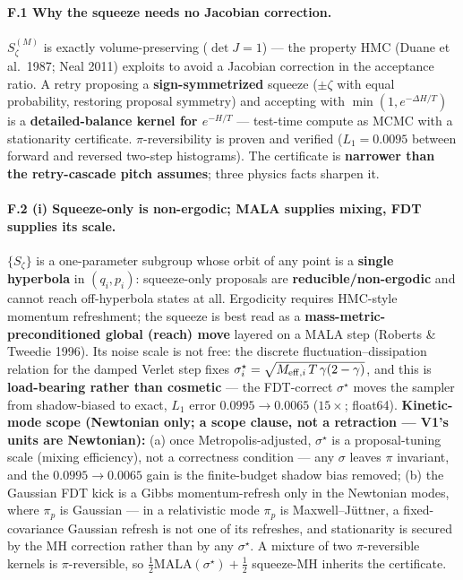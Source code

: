 \documentclass[11pt]{article}
\newcommand{\half}{\tfrac12}
\newcommand{\detJ}{\det J}
\begin{document}
\paragraph{F.1 Why the squeeze needs no Jacobian correction.} $S^{(M)}_\zeta$ is exactly volume-preserving ($\detJ=1$) --- the property HMC (Duane et al.\ 1987; Neal 2011) exploits to avoid a Jacobian correction in the acceptance ratio. A retry proposing a \textbf{sign-symmetrized} squeeze ($\pm\zeta$ with equal probability, restoring proposal symmetry) and accepting with $\min(1,e^{-\Delta H/T})$ is a \textbf{detailed-balance kernel for $e^{-H/T}$} --- test-time compute as MCMC with a stationarity certificate. $\pi$-reversibility is proven and verified ($L_1=0.0095$ between forward and reversed two-step histograms). The certificate is \textbf{narrower than the retry-cascade pitch assumes}; three physics facts sharpen it.

\paragraph{F.2 (i) Squeeze-only is non-ergodic; MALA supplies mixing, FDT supplies its scale.} $\{S_\zeta\}$ is a one-parameter subgroup whose orbit of any point is a \textbf{single hyperbola} in $(q_i,p_i)$: squeeze-only proposals are \textbf{reducible/non-ergodic} and cannot reach off-hyperbola states at all. Ergodicity requires HMC-style momentum refreshment; the squeeze is best read as a \textbf{mass-metric-preconditioned global (reach) move} layered on a MALA step (Roberts \& Tweedie 1996). Its noise scale is not free: the discrete fluctuation--dissipation relation for the damped Verlet step fixes $\sigma_i^\star=\sqrt{M_{{\rm eff},i}\,T\,\gamma(2-\gamma)}$, and this is \textbf{load-bearing rather than cosmetic} --- the FDT-correct $\sigma^\star$ moves the sampler from shadow-biased to exact, $L_1$ error $0.0995\to0.0065$ ($15\times$; float64). \textbf{Kinetic-mode scope (Newtonian only; a scope clause, not a retraction --- V1's units are Newtonian):} (a) once Metropolis-adjusted, $\sigma^\star$ is a proposal-tuning scale (mixing efficiency), not a correctness condition --- any $\sigma$ leaves $\pi$ invariant, and the $0.0995\to0.0065$ gain is the finite-budget shadow bias removed; (b) the Gaussian FDT kick is a Gibbs momentum-refresh only in the Newtonian modes, where $\pi_p$ is Gaussian --- in a relativistic mode $\pi_p$ is Maxwell--J\"uttner, a fixed-covariance Gaussian refresh is not one of its refreshes, and stationarity is secured by the MH correction rather than by any $\sigma^\star$. A mixture of two $\pi$-reversible kernels is $\pi$-reversible, so $\half\mathrm{MALA}(\sigma^\star)+\half$ squeeze-MH inherits the certificate.
\end{document}
